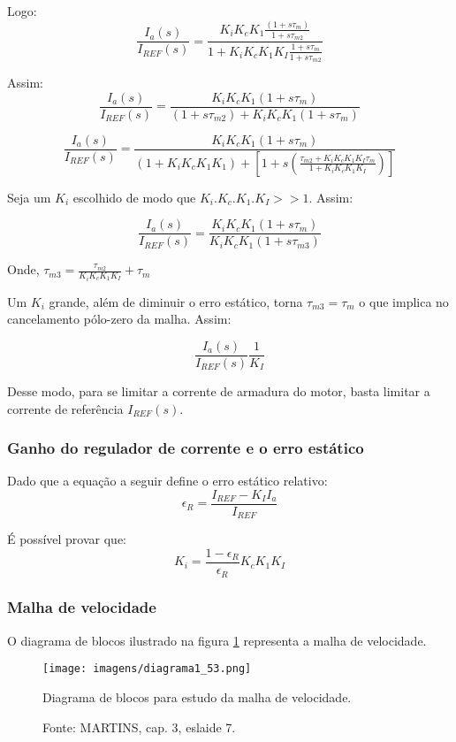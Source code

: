 Logo:
\[\frac{I_{a}(s)}{I_{REF}(s)} = \frac{K_{i}K_{e}K_{1}\frac{\left(1 + s\tau_{m}\right)}{1 + s\tau_{m2}}}{1 + K_{i}K_{c}K_{1}K_{I}\frac{1 + s\tau_{m}}{1 + s\tau_{m2}}}\]

Assim:
\[\frac{I_{a}(s)}{I_{REF}(s)} = \frac{K_{i}K_{c}K_{1}\left(1 + s\tau_{m}\right)}{\left(1 + s\tau_{m2}\right) + K_{i}K_{c}K_{1}\left(1 + s\tau_{m}\right)}\]

\[\frac{I_{a}(s)}{I_{REF}(s)} = \frac{K_{i}K_{c}K_{1}\left(1 + s\tau_{m}\right)}{\left(1 + K_{i}K_{c}K_{1}K_{1}\right) + \left[1 + s\left(\frac{\tau_{m2} + K_{i}K_{c}K_{1}K_{I}\tau_{m} }{1 + K_{i}K_{c}K_{1}K_{I}}\right)\right]}\]

Seja um $K_{i}$ escolhido de modo que $K_{i}.K_{c}.K_{1}.K_{I} >> 1$. Assim:

\[\frac{I_{a}(s)}{I_{REF}(s)} = \frac{K_{i}K_{c}K_{1}\left(1 + s\tau_{m}\right)}{ K_{i}K_{c}K_{1}\left(1 + s\tau_{m3}\right)}\]

Onde, $\tau_{m3} = \frac{\tau_{m2}}{K_{i}K_{c}K_{1}K_{I}} + \tau_{m}$

Um $K_{i}$ grande, além de diminuir o erro estático, torna $\tau_{m3} = \tau_{m}$ o que implica no cancelamento pólo-zero da malha. Assim:

\[\frac{I_{a}(s)}{I_{REF}(s)} \frac{1}{K_{I}}\]

Desse modo, para se limitar a corrente de armadura do motor, basta limitar a corrente de referência $I_{REF}(s)$. 

\subsubsection{Ganho do regulador de corrente e o erro estático}

Dado que a equação a seguir define o erro estático relativo:
\[\epsilon_{R} = \frac{I_{REF} - K_{I}I_{a}}{I_{REF}}  \]


É possível provar que:
\[K_{i} = \frac{1 - \epsilon_{R}}{\epsilon_{R}}K_{c}K_{1}K_{I}\]

\subsubsection{Malha de velocidade}

O diagrama de blocos ilustrado na figura \ref{fig:D1_53} representa a malha de velocidade.

\begin{figure}[ht!]
\center
\texttt{[image: imagens/diagrama1\_53.png]}
\caption{\label{fig:D1_53} Diagrama de blocos para estudo da malha de velocidade.}
\caption*{Fonte: MARTINS, cap. 3, eslaide 7.}
\end{figure}

